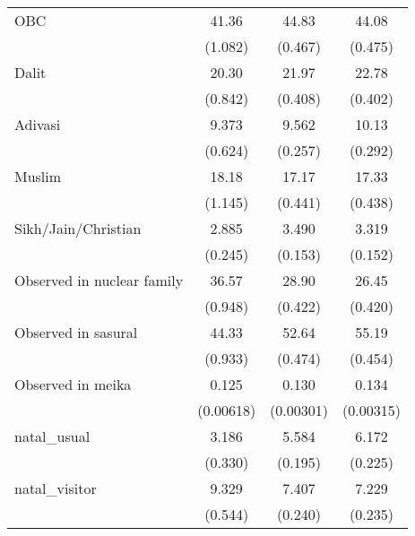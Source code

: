{\begin{tabular}{l*{3}{c}}
\addlinespace
OBC                 &       41.36\sym{***}&       44.83\sym{***}&       44.08\sym{***}\\
                    &     (1.082)         &     (0.467)         &     (0.475)         \\
\addlinespace
Dalit               &       20.30\sym{***}&       21.97\sym{***}&       22.78\sym{***}\\
                    &     (0.842)         &     (0.408)         &     (0.402)         \\
\addlinespace
Adivasi             &       9.373\sym{***}&       9.562\sym{***}&       10.13\sym{***}\\
                    &     (0.624)         &     (0.257)         &     (0.292)         \\
\addlinespace
Muslim              &       18.18\sym{***}&       17.17\sym{***}&       17.33\sym{***}\\
                    &     (1.145)         &     (0.441)         &     (0.438)         \\
\addlinespace
Sikh/Jain/Christian &       2.885\sym{***}&       3.490\sym{***}&       3.319\sym{***}\\
                    &     (0.245)         &     (0.153)         &     (0.152)         \\
\addlinespace
Observed in nuclear family&       36.57\sym{***}&       28.90\sym{***}&       26.45\sym{***}\\
                    &     (0.948)         &     (0.422)         &     (0.420)         \\
\addlinespace
Observed in sasural &       44.33\sym{***}&       52.64\sym{***}&       55.19\sym{***}\\
                    &     (0.933)         &     (0.474)         &     (0.454)         \\
\addlinespace
Observed in meika   &       0.125\sym{***}&       0.130\sym{***}&       0.134\sym{***}\\
                    &   (0.00618)         &   (0.00301)         &   (0.00315)         \\
\addlinespace
natal\_usual         &       3.186\sym{***}&       5.584\sym{***}&       6.172\sym{***}\\
                    &     (0.330)         &     (0.195)         &     (0.225)         \\
\addlinespace
natal\_visitor       &       9.329\sym{***}&       7.407\sym{***}&       7.229\sym{***}\\
                    &     (0.544)         &     (0.240)         &     (0.235)         \\

\end{tabular}}
